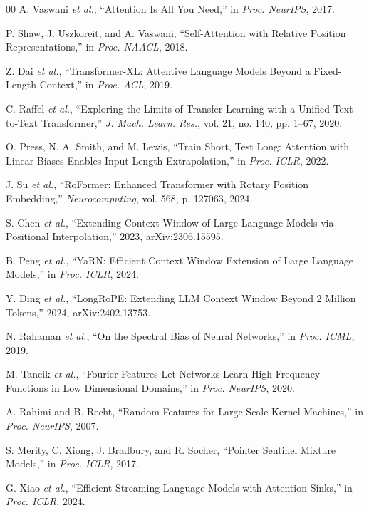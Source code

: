 \documentclass[conference]{IEEEtran}
\begin{document}
\begin{thebibliography}{00}
A. Vaswani \emph{et al.}, ``Attention Is All You Need,'' in \emph{Proc. NeurIPS}, 2017.

P. Shaw, J. Uszkoreit, and A. Vaswani, ``Self-Attention with Relative Position Representations,'' in \emph{Proc. NAACL}, 2018.

Z. Dai \emph{et al.}, ``Transformer-XL: Attentive Language Models Beyond a Fixed-Length Context,'' in \emph{Proc. ACL}, 2019.

C. Raffel \emph{et al.}, ``Exploring the Limits of Transfer Learning with a Unified Text-to-Text Transformer,'' \emph{J. Mach. Learn. Res.}, vol. 21, no. 140, pp. 1--67, 2020.

O. Press, N. A. Smith, and M. Lewis, ``Train Short, Test Long: Attention with Linear Biases Enables Input Length Extrapolation,'' in \emph{Proc. ICLR}, 2022.

J. Su \emph{et al.}, ``RoFormer: Enhanced Transformer with Rotary Position Embedding,'' \emph{Neurocomputing}, vol. 568, p. 127063, 2024.

S. Chen \emph{et al.}, ``Extending Context Window of Large Language Models via Positional Interpolation,'' 2023, arXiv:2306.15595.

B. Peng \emph{et al.}, ``YaRN: Efficient Context Window Extension of Large Language Models,'' in \emph{Proc. ICLR}, 2024.

Y. Ding \emph{et al.}, ``LongRoPE: Extending LLM Context Window Beyond 2 Million Tokens,'' 2024, arXiv:2402.13753.

N. Rahaman \emph{et al.}, ``On the Spectral Bias of Neural Networks,'' in \emph{Proc. ICML}, 2019.

M. Tancik \emph{et al.}, ``Fourier Features Let Networks Learn High Frequency Functions in Low Dimensional Domains,'' in \emph{Proc. NeurIPS}, 2020.

A. Rahimi and B. Recht, ``Random Features for Large-Scale Kernel Machines,'' in \emph{Proc. NeurIPS}, 2007.

S. Merity, C. Xiong, J. Bradbury, and R. Socher, ``Pointer Sentinel Mixture Models,'' in \emph{Proc. ICLR}, 2017.

G. Xiao \emph{et al.}, ``Efficient Streaming Language Models with Attention Sinks,'' in \emph{Proc. ICLR}, 2024.
\end{thebibliography}
\end{document}
